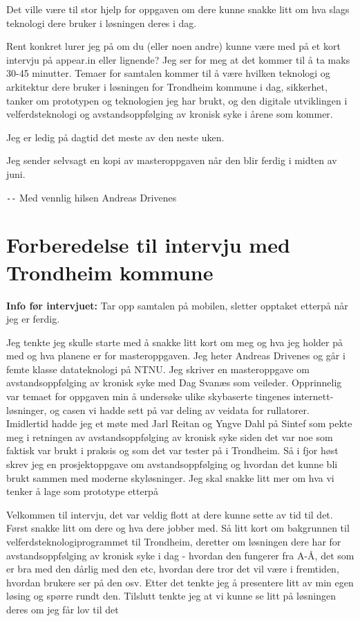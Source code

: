 Det ville være til stor hjelp for oppgaven om dere kunne snakke litt om hva slags teknologi dere bruker i løsningen deres i dag.

Rent konkret lurer jeg på om du (eller noen andre) kunne være med på et kort intervju på appear.in eller lignende? 
Jeg ser for meg at det kommer til å ta maks 30-45 minutter. Temaer for samtalen kommer til å være hvilken teknologi og arkitektur
dere bruker i løsningen for Trondheim kommune i dag, sikkerhet, tanker om prototypen og teknologien jeg har brukt, og den
digitale utviklingen i velferdsteknologi og avstandsoppfølging av kronisk syke i årene som kommer.

Jeg er ledig på dagtid det meste av den neste uken.

Jeg sender selvsagt en kopi av masteroppgaven når den blir ferdig i midten av juni.

\verb|--| \newline
Med vennlig hilsen \newline
Andreas Drivenes \newline

\chapter{Forberedelse til intervju med Trondheim kommune}
\label{appendix:forberedelse}
\textbf{Info før intervjuet:}
Tar opp samtalen på mobilen, sletter opptaket etterpå når jeg er ferdig. 
 
Jeg tenkte jeg skulle starte med å snakke litt kort om meg og hva jeg holder på med og hva planene er for masteroppgaven. Jeg heter Andreas Drivenes og går i femte klasse datateknologi på NTNU. Jeg skriver en masteroppgave om avstandsoppfølging av kronisk syke med Dag Svanæs som veileder. Opprinnelig var temaet for oppgaven min å undersøke ulike skybaserte tingenes internett-løsninger, og casen vi hadde sett på var deling av veidata for rullatorer. Imidlertid hadde jeg et møte med Jarl Reitan og Yngve Dahl på Sintef som pekte meg i retningen av avstandsoppfølging av kronisk syke siden det var noe som faktisk var brukt i praksis og som det var tester på i Trondheim. Så i fjor høst skrev jeg en prosjektoppgave om avstandsoppfølging og hvordan det kunne bli brukt sammen med moderne skyløsninger. Jeg skal snakke litt mer om hva vi tenker å lage som prototype etterpå
 
Velkommen til intervju, det var veldig flott at dere kunne sette av tid til det. Først snakke litt om dere og hva dere jobber med. Så litt kort om bakgrunnen til velferdsteknologiprogrammet til Trondheim, deretter om løsningen dere har for avstandsoppfølging av kronisk syke i dag - hvordan den fungerer fra A-Å, det som er bra med den dårlig med den etc, hvordan dere tror det vil være i fremtiden, hvordan brukere ser på den osv. Etter det tenkte jeg å presentere litt av min egen løsing og spørre rundt den. Tilslutt tenkte jeg at vi kunne se litt på løsningen deres om jeg får lov til det
 
